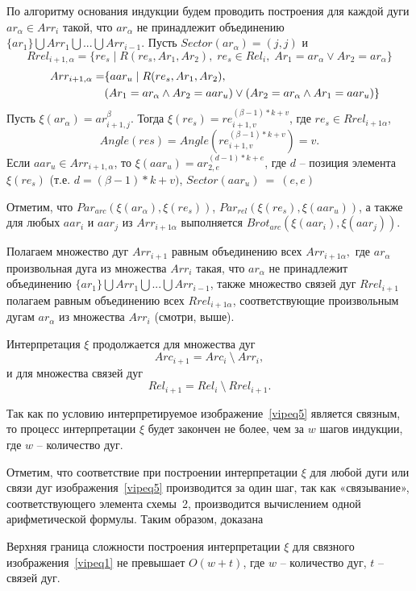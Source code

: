 По алгоритму основания индукции будем проводить построения для каждой дуги $ar_\alpha \in Arr_i$ такой, что $ar_\alpha$ не принадлежит объединению $\{ar_1 \} \bigcup Arr_1 \bigcup ... \bigcup Arr_{i-1}$.
Пусть $Sector(ar_\alpha) = (j, j)$ и 
$$Rrel_{i+1,\alpha} = \{ re_s\;|\;R(re_s, Ar_1 , Ar_2),\;re_s \in Rel_i,\;Ar_1 = ar_\alpha \vee Ar_2 = ar_\alpha \}$$
\begin{equation*}
\begin{split}
\shoveleft Arr_{i+1,\alpha} = &\{aar_u\;|\;R(re_s, Ar_1 , Ar_2), \\
&(Ar_1 = ar_\alpha \wedge Ar_2 = aar_u) \vee (Ar_2 = ar_\alpha \wedge Ar_1 = aar_u)\}
\end{split}
\end{equation*}
Пусть $\xi(ar_\alpha) = ar_{i+1,j}^\beta$.
Тогда $\xi(re_s) =re_{i+1,v}^{(\beta-1)*k+v}$, где $re_s \in Rrel_{i+1\alpha}$, 
$$Angle(res) = Angle(re_{i+1, v}^{(\beta-1)*k+v}) = v.$$
Если $aar_u \in Arr_{i+1,\alpha}$, то $\xi(aar_u) = ar_{2,e}^{(d-1)*k+e}$, где $d$ – позиция элемента~$\xi(re_s)$ (т.е. $d =(\beta-1)*k+v)$, $Sector(aar_u)~=~(e, e)$

Отметим, что $Par_{arc}(\xi(ar_\alpha), \xi(re_s))$, 
$Par_{rel}(\xi(re_s),\xi(aar_u))$, а также для любых $aar_i$ и $aar_j$ из 
$Arr_{i+1\alpha}$ выполняется $Brot_{arc}(\xi(aar_i), \xi(aar_j))$.

Полагаем множество дуг $Arr_{i+1}$ равным объединению всех $Arr_{i+1\alpha},$ где $ar_\alpha$ произвольная дуга из множества $Arr_i$ такая, что $ar_\alpha$ не принадлежит объединению 
$\{ar_1\} \bigcup Arr_1 \bigcup ... \bigcup Arr_{i-1}$, также множество связей дуг $Rrel_{i+1}$ полагаем равным объединению всех $Rrel_{i+1\alpha}$, соответствующие произвольным дугам $ar_\alpha$ из множества $Arr_i$ (смотри, выше).

Интерпретация  $\xi$ продолжается для множества дуг
$$Arc_{i+1} = Arc_i~\setminus~Arr_i,$$
и для множества  связей дуг
$$Rel_{i+1}=Rel_i~\setminus~Rrel_{i+1}.$$

Так как по условию интерпретируемое изображение~\ref{vipeq5} является  связным, то процесс интерпретации  $\xi$   будет закончен не более, чем за $w$  шагов индукции, где $w$ – количество дуг. 

Отметим, что соответствие при построении интерпретации $\xi$  для любой дуги или связи дуг изображения~\ref{vipeq5}  производится за  один шаг, так как «связывание», соответствующего элемента схемы~2,  производится вычислением одной арифметической формулы. Таким образом, доказана 
\begin{lemma}
Верхняя граница сложности построения интерпретации $\xi$ для связного изображения~\ref{vipeq1} не превышает $O(w+t)$, где  $w$ -- количество дуг, $t$ -- связей дуг.
\label{viplm1}
\end{lemma}

